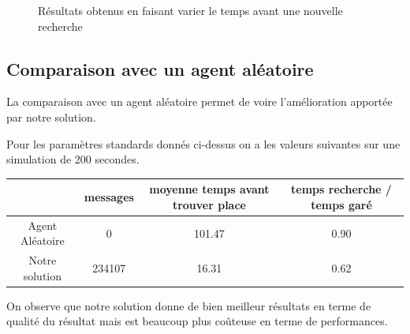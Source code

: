 \begin{figure}
\begin{center}
  \end{center}

  \caption{Résultats obtenus en faisant varier le temps avant une nouvelle recherche}
  \label{timeb4search:all}
\end{figure}

\subsection{Comparaison avec un agent aléatoire}

La comparaison avec un agent aléatoire permet de voire l'amélioration apportée par notre solution.

Pour les paramètres standards donnés ci-dessus on a les valeurs suivantes sur une simulation de 200 secondes.

\begin{center}
  \begin{tabular}{c|c|c|c}
    & messages & moyenne temps avant trouver place & temps recherche / temps garé\\
    \hline
    Agent Aléatoire & 0        & 101.47                            & 0.90\\
    \hline
    Notre solution  & 234107   & 16.31                             & 0.62\\
  \end{tabular}
\end{center}

On observe que notre solution donne de bien meilleur résultats en terme de qualité du résultat mais est beaucoup plus coûteuse en terme de performances.

